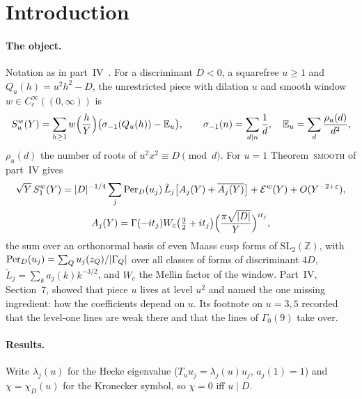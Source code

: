 \documentclass[11pt,a4paper]{article}
\theoremstyle{remark}\newtheorem{remark}[theorem]{Remark}
\newcommand{\Z}{\mathbb Z}\newcommand{\R}{\mathbb R}\newcommand{\Q}{\mathbb Q}\newcommand{\HH}{\mathbb H}
\begin{document}
\section{Introduction}\label{sec:intro}

\paragraph{The object.} Notation as in part~IV~\cite{ReichardtIV}. For a discriminant $D<0$, a squarefree $u\ge1$ and
$Q_u(h)=u^2h^2-D$, the unrestricted piece with dilation $u$ and smooth window $w\in C_c^\infty((0,\infty))$ is
\[
S^w_u(Y)=\sum_{h\ge1}w\Bigl(\frac hY\Bigr)\bigl(\sigma_{-1}(Q_u(h))-\mathbb E_u\bigr),\qquad
\sigma_{-1}(n)=\sum_{d\mid n}\frac1d,\quad \mathbb E_u=\sum_d\frac{\rho_u(d)}{d^2},
\]
$\rho_u(d)$ the number of roots of $u^2x^2\equiv D\pmod d$. For $u=1$ Theorem~\textsc{smooth} of part~IV gives
\begin{equation}\label{eq:smooth1}
\begin{gathered}
\sqrt Y\,S^w_1(Y)=|D|^{-1/4}\sum_j\mathrm{Per}_D(u_j)\,\tilde L_j\bigl[A_j(Y)+\overline{A_j(Y)}\bigr]+\mathcal E^w(Y)+O(Y^{-2+\varepsilon}),\\
A_j(Y)=\Gamma(-it_j)W_c\bigl(\tfrac32+it_j\bigr)\Bigl(\frac{\pi\sqrt{|D|}}Y\Bigr)^{it_j},
\end{gathered}
\end{equation}
the sum over an orthonormal basis of even Maass cusp forms of $\mathrm{SL}_2(\Z)$, with $\mathrm{Per}_D(u_j)=\sum_Qu_j(z_Q)/|\Gamma_Q|$
over all classes of forms of discriminant $4D$, $\tilde L_j=\sum_ka_j(k)k^{-3/2}$, and $W_c$ the Mellin factor of the window.
Part~IV, Section~7, showed that piece $u$ lives at level $u^2$ and named the one missing ingredient: how the coefficients
depend on $u$. Its footnote on $u=3,5$ recorded that the level-one lines are weak there and that the lines of $\Gamma_0(9)$
take over.

\paragraph{Results.} Write $\lambda_j(u)$ for the Hecke eigenvalue ($T_uu_j=\lambda_j(u)u_j$, $a_j(1)=1$) and
$\chi=\chi_D(u)$ for the Kronecker symbol, so $\chi=0$ iff $u\mid D$.
\end{document}
